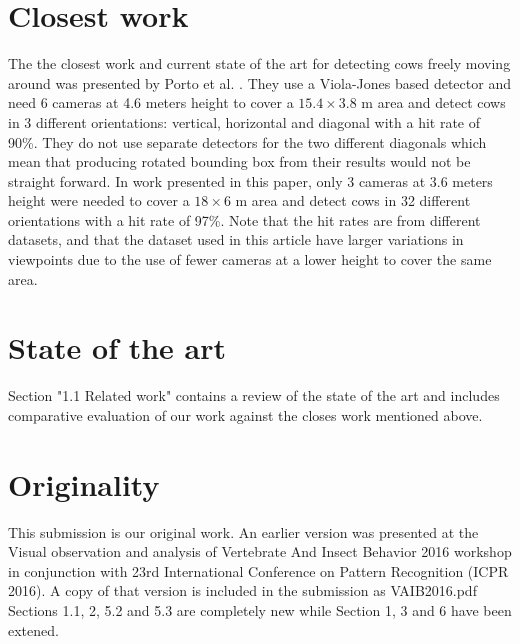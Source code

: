 \documentclass[10pt,a4paper]{article}
\begin{document}
\section{Closest work}
The the closest work and current state of the art for detecting cows freely moving around was presented by Porto et al. \cite{porto2015automatic}. They use a Viola-Jones based detector and need 
6 cameras at 4.6 meters height to cover a $15.4 \times 3.8$ m area and detect cows in 3 different orientations: vertical, horizontal and diagonal with a hit rate of 90\%. They do not use separate detectors for the two different diagonals which mean that producing rotated bounding box from their results would not be straight forward. In work presented in this paper, only 3 cameras at 3.6 meters height were needed to cover a $18 \times 6$ m area and detect cows in 32 different orientations with a hit rate of 97\%. Note that the hit rates are from different datasets, and that the dataset used in this article have larger variations in viewpoints due to the use of fewer cameras at a lower height to cover the same area.

\section{State of the art}
Section "1.1 Related work" contains a review of the state of the art and includes comparative evaluation of our work against the closes work mentioned above.

\section{Originality}
This submission is our original work. An earlier version was presented at the Visual observation and analysis of Vertebrate And Insect Behavior 2016 workshop  in conjunction with 23rd International Conference on Pattern Recognition (ICPR 2016). A copy of that version is included in the submission as VAIB2016.pdf Sections 1.1, 2, 5.2 and 5.3 are completely new while Section 1, 3 and 6 have been extened.


{\parindent0pt
\parskip8pt

}
\end{document}

